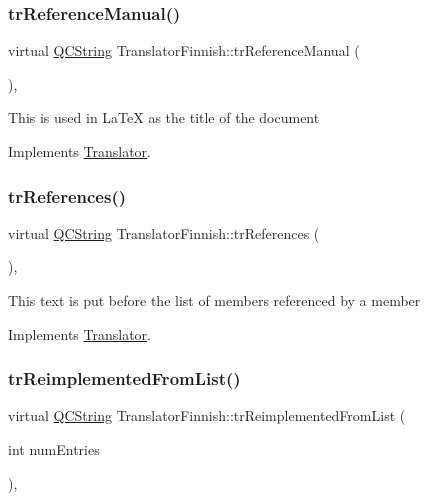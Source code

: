 \subsubsection{\texorpdfstring{trReferenceManual()}{trReferenceManual()}}
{\footnotesize\ttfamily virtual \mbox{\hyperlink{class_q_c_string}{Q\+C\+String}} Translator\+Finnish\+::tr\+Reference\+Manual (\begin{DoxyParamCaption}{ }\end{DoxyParamCaption})\hspace{0.3cm}{\ttfamily [inline]}, {\ttfamily [virtual]}}

This is used in La\+TeX as the title of the document 

Implements \mbox{\hyperlink{class_translator}{Translator}}.

\mbox{\label{class_translator_finnish_af7cf589260d7dbf2feb77bc6f3bee256}} 
\subsubsection{\texorpdfstring{trReferences()}{trReferences()}}
{\footnotesize\ttfamily virtual \mbox{\hyperlink{class_q_c_string}{Q\+C\+String}} Translator\+Finnish\+::tr\+References (\begin{DoxyParamCaption}{ }\end{DoxyParamCaption})\hspace{0.3cm}{\ttfamily [inline]}, {\ttfamily [virtual]}}

This text is put before the list of members referenced by a member 

Implements \mbox{\hyperlink{class_translator}{Translator}}.

\mbox{\label{class_translator_finnish_a78a0191cac276916ec7dd530658b7fd9}} 
\subsubsection{\texorpdfstring{trReimplementedFromList()}{trReimplementedFromList()}}
{\footnotesize\ttfamily virtual \mbox{\hyperlink{class_q_c_string}{Q\+C\+String}} Translator\+Finnish\+::tr\+Reimplemented\+From\+List (\begin{DoxyParamCaption}\item[{int}]{num\+Entries }\end{DoxyParamCaption})\hspace{0.3cm}{\ttfamily [inline]}, {\ttfamily [virtual]}}

